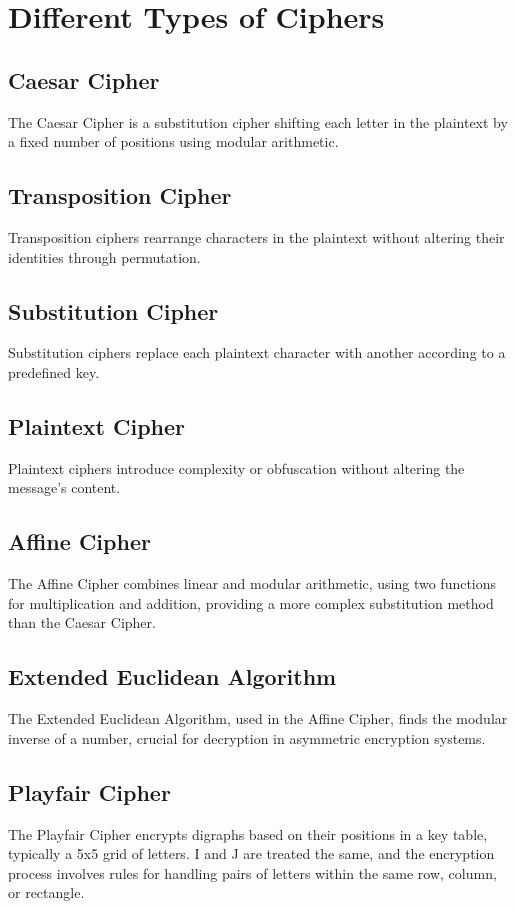 \documentclass[11pt]{article}
\begin{document}
\section*{Different Types of Ciphers}

\subsection*{Caesar Cipher}
The Caesar Cipher is a substitution cipher shifting each letter in the plaintext by a fixed number of positions using modular arithmetic.

\subsection*{Transposition Cipher}
Transposition ciphers rearrange characters in the plaintext without altering their identities through permutation.

\subsection*{Substitution Cipher}
Substitution ciphers replace each plaintext character with another according to a predefined key.

\subsection*{Plaintext Cipher}
Plaintext ciphers introduce complexity or obfuscation without altering the message's content.

\subsection*{Affine Cipher}
The Affine Cipher combines linear and modular arithmetic, using two functions for multiplication and addition, providing a more complex substitution method than the Caesar Cipher.

\subsection*{Extended Euclidean Algorithm}
The Extended Euclidean Algorithm, used in the Affine Cipher, finds the modular inverse of a number, crucial for decryption in asymmetric encryption systems.

\subsection*{Playfair Cipher}
The Playfair Cipher encrypts digraphs based on their positions in a key table, typically a 5x5 grid of letters. I and J are treated the same, and the encryption process involves rules for handling pairs of letters within the same row, column, or rectangle.
\end{document}
